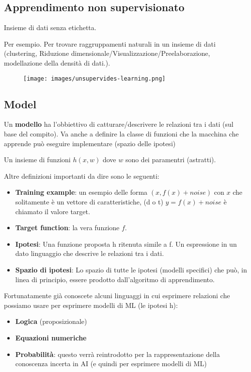 \subsection{Apprendimento non supervisionato}
\begin{definition}
    Insieme di dati senza etichetta.
\end{definition}
Per esempio. Per trovare raggruppamenti naturali in un insieme di dati (clustering,
Riduzione dimensionale/Visualizzazione/Preelaborazione, modellazione della densità di dati.).
\begin{figure}[h!]
    \centering
    \texttt{[image: images/unsupervides-learning.png]}
\end{figure}

\subsection{Model}
Un \textbf{modello} ha l'obbiettivo di catturare/descrivere le relazioni tra i dati (sul base del compito). 
Va anche a definire la classe di funzioni che la macchina che apprende può eseguire implementare (spazio delle ipotesi)
\begin{example}
    Un insieme di funzioni $h(x, w)$ dove $w$ sono dei paramentri (astratti).
\end{example}
Altre definizioni importanti da dire sono le seguenti:
\begin{itemize}
    \item \textbf{Training example}: un esempio delle forma $(x, f(x) + noise)$ con $x$ che solitamente 
    è un vettore di caratteristiche, (d o t) $y = f(x) + noise$ è chiamato il valore target.
    \item \textbf{Target function}: la vera funzione $f$.
    \item \textbf{Ipotesi}: Una funzione proposta h ritenuta simile a f. Un espressione in un dato linguaggio che descrive le relazioni tra i dati.
    \item \textbf{Spazio di ipotesi}: Lo spazio di tutte le ipotesi (modelli specifici) che può, in linea di principio, essere prodotto dall'algoritmo di apprendimento.
\end{itemize}
Fortunatamente già conoscete alcuni linguaggi in cui esprimere relazioni che possiamo usare per esprimere modelli di ML (le ipotesi h):
\begin{itemize}
    \item \textbf{Logica} (proposizionale)
    \item \textbf{Equazioni numeriche}
    \item \textbf{Probabilità}: questo verrà reintrodotto per la rappresentazione della conoscenza incerta in AI (e quindi per esprimere modelli di ML)
\end{itemize}
